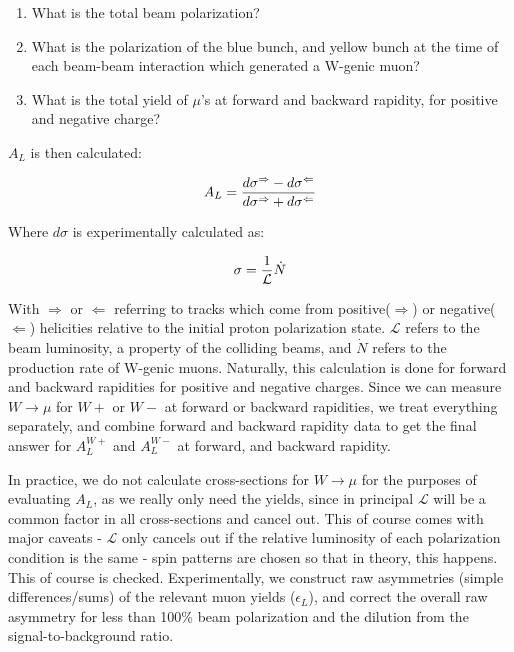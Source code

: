 \begin{enumerate}
  \item What is the total beam polarization?
  \item What is the polarization of the blue bunch, and yellow bunch at the
    time of each beam-beam interaction which generated a W-genic muon?
  \item What is the total yield of $\mu$'s at forward and backward rapidity,
    for positive and negative charge?
\end{enumerate}

$A_L$ is then calculated:

\begin{equation}
  A_L = {
    {d\sigma^{\Rightarrow} - d\sigma^{\Leftarrow}}
    \over
    {d\sigma^{\Rightarrow} + d\sigma^{\Leftarrow}}
  }
\end{equation}

Where $d\sigma$ is experimentally calculated as:

\begin{equation}
  \sigma = {1\over{\mathcal{L}}}{\dot{N}}
\end{equation}

With $\Rightarrow$ or $\Leftarrow$ referring to tracks which come from
positive($\Rightarrow$) or negative($\Leftarrow$) helicities relative to the
initial proton polarization state. $\mathcal{L}$ refers to the beam luminosity,
a property of the colliding beams, and $\dot{N}$ refers to the production rate
of W-genic muons. Naturally, this calculation is done for forward and backward
rapidities for positive and negative charges. Since we can measure
$W\rightarrow\mu$ for $W+$ or $W-$ at forward or backward rapidities, we treat
everything separately, and combine forward and backward rapidity data to get the
final answer for $A_L^{W+}$ and $A_L^{W-}$ at forward, and backward rapidity.

In practice, we do not calculate cross-sections for $W\rightarrow\mu$ for the
purposes of evaluating $A_L$, as we really only need the yields, since in
principal $\mathcal{L}$ will be a common factor in all cross-sections and cancel
out. This of course comes with major caveats - $\mathcal{L}$ only cancels out if
the relative luminosity of each polarization condition is the same - spin
patterns are chosen so that in theory, this happens. This of course is checked.
Experimentally, we construct raw asymmetries (simple differences/sums) of the
relevant muon yields ($\epsilon_{L}$), and correct the overall raw asymmetry for
less than 100\% beam polarization and the dilution from the signal-to-background
ratio.

